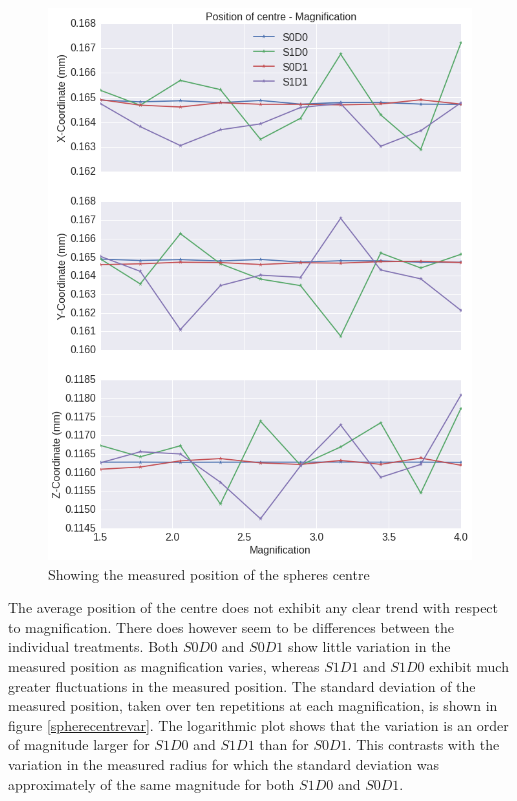 \documentclass[
  twoside,
  11pt, a4paper,
  footinclude=true,
  headinclude=true,
  cleardoublepage=empty
]{scrbook}
\begin{document}
\begin{figure}[h!]
  \centering
    \includegraphics[width=\textwidth]{figures/output_18_0.png}
    \caption{Showing the measured position of the spheres centre}
        \label{spherecentre}
\end{figure}

The average position of the centre does not exhibit any clear trend with respect to magnification. There does however seem to be differences between the individual treatments. Both $S0D0$ and $S0D1$ show little variation in the measured position as magnification varies, whereas $S1D1$ and $S1D0$ exhibit much greater fluctuations in the measured position. The standard deviation of the measured position, taken over ten repetitions at each magnification, is shown in figure \ref{spherecentrevar}. The logarithmic plot shows that the variation is an order of magnitude larger for $S1D0$ and $S1D1$ than for $S0D1$. This contrasts with the variation in the measured radius for which the standard deviation was approximately of the same magnitude for both $S1D0$ and $S0D1$.
\end{document}
